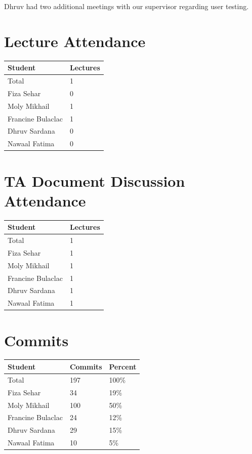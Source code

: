 \documentclass{article}
\begin{document}
Dhruv had two additional meetings with our supervisor regarding user testing.

\section{Lecture Attendance}


\begin{table}[H]
\centering
\begin{tabular}{ll}
\toprule
\textbf{Student} & \textbf{Lectures}\\
\midrule
Total & 1\\
Fiza Sehar & 0\\
Moly Mikhail & 1\\
Francine Bulaclac & 1\\
Dhruv Sardana & 0\\
Nawaal Fatima & 0\\
\bottomrule
\end{tabular}
\end{table}


\section{TA Document Discussion Attendance}

\begin{table}[H]
\centering
\begin{tabular}{ll}
\toprule
\textbf{Student} & \textbf{Lectures}\\
\midrule
Total & 1\\
Fiza Sehar & 1\\
Moly Mikhail & 1\\
Francine Bulaclac & 1\\
Dhruv Sardana & 1\\
Nawaal Fatima & 1\\
\bottomrule
\end{tabular}
\end{table}

\section{Commits}


\begin{table}[H]
\centering
\begin{tabular}{lll}
\toprule
\textbf{Student} & \textbf{Commits} & \textbf{Percent}\\
\midrule
Total & 197 & 100\% \\
Fiza Sehar & 34 & 19\% \\
Moly Mikhail & 100 & 50\% \\
Francine Bulaclac & 24 & 12\% \\
Dhruv Sardana & 29 & 15\% \\
Nawaal Fatima & 10 & 5\% \\
\bottomrule
\end{tabular}
\end{table}
\end{document}

